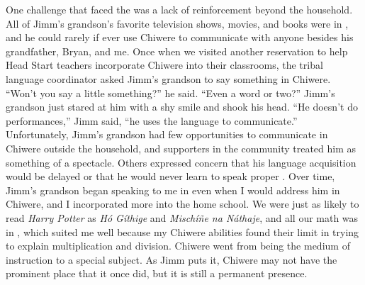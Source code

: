 \documentclass[output=paper]{LSP/langsci}
\begin{document}
One challenge that faced the  was a lack of reinforcement beyond the household. All of Jimm's grandson's favorite television shows, movies, and books were in , and he could rarely if ever use Chiwere to communicate with anyone besides his grandfather, Bryan, and me. Once when we visited another reservation to help Head Start teachers incorporate Chiwere into their classrooms, the tribal language coordinator asked Jimm's grandson to say something in Chiwere. ``Won't you say a little something?'' he said. ``Even a word or two?'' Jimm's grandson just stared at him with a shy smile and shook his head. ``He doesn't do performances,'' Jimm said, ``he uses the language to communicate.'' Unfortunately, Jimm's grandson had few opportunities to communicate in Chiwere outside the household, and supporters in the community treated him as something of a spectacle. Others expressed concern that his language acquisition would be delayed or that he would never learn to speak proper . Over time, Jimm's grandson began speaking to me in  even when I would address him in Chiwere, and I incorporated more  into the home school. We were just as likely to read \emph{Harry Potter} as \emph{Hó Gíthige} and \emph{Mischíñe na Náthaje}, and all our math was in , which suited me well because my Chiwere abilities found their limit in trying to explain multiplication and division. Chiwere went from being the medium of instruction to a special subject. As Jimm puts it, Chiwere may not have the prominent place that it once did, but it is still a permanent presence.
\end{document}
